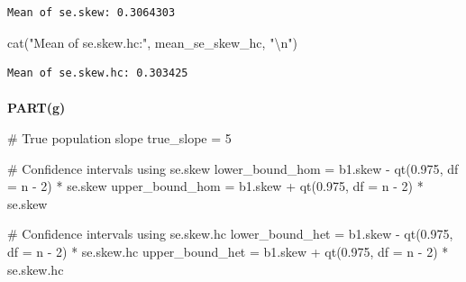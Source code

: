 \documentclass[
  11pt,
]{article}
\makeatletter
\let\oldparagraph\paragraph
\renewcommand{\paragraph}{
    \@ifstar
      \xxxParagraphStar
      \xxxParagraphNoStar
  }
\newcommand{\xxxParagraphStar}[1]{\oldparagraph*{#1}\mbox{}}
\newcommand{\xxxParagraphNoStar}[1]{\oldparagraph{#1}\mbox{}}
\newenvironment{Shaded}{\begin{snugshade}}{\end{snugshade}}
\newcommand{\AttributeTok}[1]{\textcolor[rgb]{0.40,0.45,0.13}{#1}}
\newcommand{\CommentTok}[1]{\textcolor[rgb]{0.37,0.37,0.37}{#1}}
\newcommand{\DecValTok}[1]{\textcolor[rgb]{0.68,0.00,0.00}{#1}}
\newcommand{\FloatTok}[1]{\textcolor[rgb]{0.68,0.00,0.00}{#1}}
\newcommand{\FunctionTok}[1]{\textcolor[rgb]{0.28,0.35,0.67}{#1}}
\newcommand{\NormalTok}[1]{\textcolor[rgb]{0.00,0.23,0.31}{#1}}
\newcommand{\OtherTok}[1]{\textcolor[rgb]{0.00,0.23,0.31}{#1}}
\newcommand{\SpecialCharTok}[1]{\textcolor[rgb]{0.37,0.37,0.37}{#1}}
\newcommand{\StringTok}[1]{\textcolor[rgb]{0.13,0.47,0.30}{#1}}
\makeatother
\begin{document}
\begin{verbatim}
Mean of se.skew: 0.3064303 
\end{verbatim}

\begin{Shaded}
\begin{Highlighting}[]
\FunctionTok{cat}\NormalTok{(}\StringTok{"Mean of se.skew.hc:"}\NormalTok{, mean\_se\_skew\_hc, }\StringTok{"}\SpecialCharTok{\textbackslash{}n}\StringTok{"}\NormalTok{)}
\end{Highlighting}
\end{Shaded}

\begin{verbatim}
Mean of se.skew.hc: 0.303425 
\end{verbatim}

\paragraph{\texorpdfstring{\textbf{PART(g)}}{PART(g)}}\label{partg}

\begin{Shaded}
\begin{Highlighting}[]
\CommentTok{\# True population slope }
\NormalTok{true\_slope }\OtherTok{=} \DecValTok{5}

\CommentTok{\# Confidence intervals using se.skew}
\NormalTok{lower\_bound\_hom }\OtherTok{=}\NormalTok{ b1.skew }\SpecialCharTok{{-}} \FunctionTok{qt}\NormalTok{(}\FloatTok{0.975}\NormalTok{, }\AttributeTok{df =}\NormalTok{ n }\SpecialCharTok{{-}} \DecValTok{2}\NormalTok{) }\SpecialCharTok{*}\NormalTok{ se.skew}
\NormalTok{upper\_bound\_hom }\OtherTok{=}\NormalTok{ b1.skew }\SpecialCharTok{+} \FunctionTok{qt}\NormalTok{(}\FloatTok{0.975}\NormalTok{, }\AttributeTok{df =}\NormalTok{ n }\SpecialCharTok{{-}} \DecValTok{2}\NormalTok{) }\SpecialCharTok{*}\NormalTok{ se.skew}

\CommentTok{\# Confidence intervals using se.skew.hc}
\NormalTok{lower\_bound\_het }\OtherTok{=}\NormalTok{ b1.skew }\SpecialCharTok{{-}} \FunctionTok{qt}\NormalTok{(}\FloatTok{0.975}\NormalTok{, }\AttributeTok{df =}\NormalTok{ n }\SpecialCharTok{{-}} \DecValTok{2}\NormalTok{) }\SpecialCharTok{*}\NormalTok{ se.skew.hc}
\NormalTok{upper\_bound\_het }\OtherTok{=}\NormalTok{ b1.skew }\SpecialCharTok{+} \FunctionTok{qt}\NormalTok{(}\FloatTok{0.975}\NormalTok{, }\AttributeTok{df =}\NormalTok{ n }\SpecialCharTok{{-}} \DecValTok{2}\NormalTok{) }\SpecialCharTok{*}\NormalTok{ se.skew.hc}
\end{Highlighting}
\end{Shaded}
\end{document}
